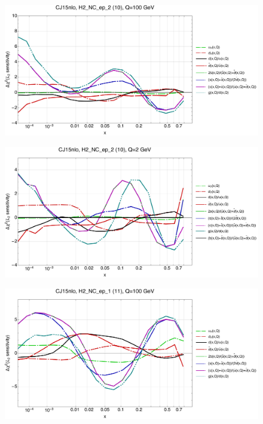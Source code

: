 \documentclass[10pt,aps,prd,floatfix,titlepage]{revtex4}
\begin{document}
\clearpage
\begin{figure}
\includegraphics[width=\textwidth,height=0.44\textheight,keepaspectratio]{2/10_CJ15nlo_q100_Sf_2.pdf}
\caption{}
\end{figure}
\begin{figure}
\includegraphics[width=\textwidth,height=0.44\textheight,keepaspectratio]{2/10_CJ15nlo_q2_Sf_2.pdf}
\caption{}
\end{figure}
\clearpage
\begin{figure}
\includegraphics[width=\textwidth,height=0.44\textheight,keepaspectratio]{2/11_CJ15nlo_q100_Sf_2.pdf}
\caption{}
\end{figure}
\end{document}
